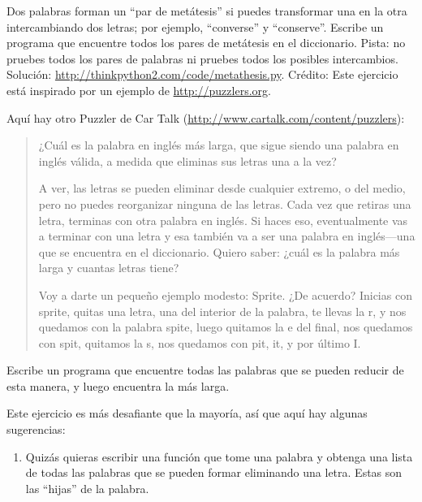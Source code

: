 \documentclass[10pt]{book}
\begin{document}
\begin{exercise}

Dos palabras forman un ``par de metátesis'' si puedes transformar una en la
otra intercambiando dos letras; por ejemplo, ``converse'' y
``conserve''.  Escribe un programa que encuentre todos los pares de metátesis
en el diccionario.  Pista: no pruebes todos los pares de palabras ni
pruebes todos los posibles intercambios.  Solución:
\url{http://thinkpython2.com/code/metathesis.py}.  Crédito: Este
ejercicio está inspirado por un ejemplo de \url{http://puzzlers.org}.

\end{exercise}


\begin{exercise}

Aquí hay otro Puzzler de Car Talk
(\url{http://www.cartalk.com/content/puzzlers}):

\begin{quote}
¿Cuál es la palabra en inglés más larga, que sigue siendo una palabra en inglés
válida, a medida que eliminas sus letras una a la vez?

A ver, las letras se pueden eliminar desde cualquier extremo, o del medio, pero
no puedes reorganizar ninguna de las letras. Cada vez que retiras una letra,
terminas con otra palabra en inglés. Si haces eso, eventualmente
vas a terminar con una letra y esa también va a ser una
palabra en inglés---una que se encuentra en el diccionario. Quiero saber:
¿cuál es la palabra más larga y cuantas letras
tiene?

Voy a darte un pequeño ejemplo modesto: Sprite. ¿De acuerdo? Inicias
con sprite, quitas una letra, una del interior de la
palabra, te llevas la r, y nos quedamos con la palabra spite, luego
quitamos la e del final, nos quedamos con spit, quitamos la s, nos
quedamos con pit, it, y por último I.
\end{quote}

Escribe un programa que encuentre todas las palabras que se pueden reducir de
esta manera, y luego encuentra la más larga.

Este ejercicio es más desafiante que la mayoría, así que aquí hay
algunas sugerencias:

\begin{enumerate}

\item Quizás quieras escribir una función que tome una palabra y
  obtenga una lista de todas las palabras que se pueden formar eliminando una
  letra.  Estas son las ``hijas'' de la palabra.


\end{enumerate}
\end{exercise}
\end{document}
